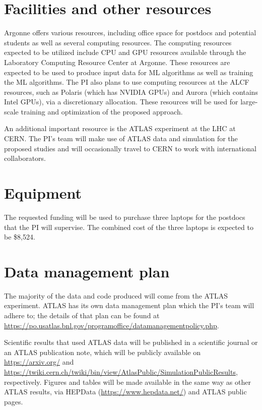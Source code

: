 \documentclass[letter, USenglish, 11pt, subfigure]{article}
\begin{document}
\printbibliography[title={Bibliography and References},heading=bibnumbered]
\clearpage

\section{Facilities and  other resources}
Argonne offers various resources, including office space for postdocs and potential students as well as several computing resources. The computing resources expected to be utilized include CPU and GPU resources available through the Laboratory Computing Resource Center at Argonne. These resources are expected to be used to produce input data for ML algorithms as well as training the ML algorithms. The PI also plans to use computing resources at the ALCF resources, such as Polaris (which has NVIDIA GPUs) and Aurora (which contains Intel GPUs), via a discretionary allocation. These resources will be used for large-scale training and optimization of the proposed approach.

An additional important resource is the ATLAS experiment at the LHC at CERN. The PI's team will make use of ATLAS data and simulation for the proposed studies and will occasionally travel to CERN to work with international collaborators.

\clearpage

\section{Equipment}
The requested funding will be used to purchase three laptops for the postdocs that the PI will supervise. The combined cost of the three laptops is expected to be \$8,524.

\clearpage

\section{Data management plan}
The majority of the data and code produced will come from the ATLAS experiment. ATLAS has its own data management plan which the PI's team will adhere to; the details of that plan can be found at \url{https://po.usatlas.bnl.gov/programoffice/datamanagementpolicy.php}.

Scientific results that used ATLAS data will be published in a scientific journal or an ATLAS publication note, which will be publicly available on \url{https://arxiv.org/} and \url{https://twiki.cern.ch/twiki/bin/view/AtlasPublic/SimulationPublicResults}, respectively. Figures and tables will be made available in the same way as other ATLAS results, via HEPData (\url{https://www.hepdata.net/}) and ATLAS public pages. 
\end{document}
